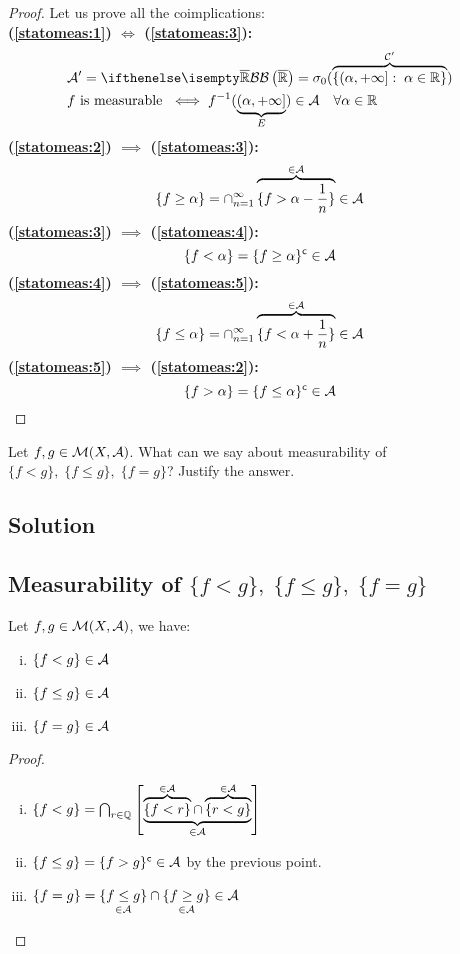 \begin{proof}
    Let us prove all the coimplications:\\
    \textbf{(\ref{statomeas:1}) $\iff$ (\ref{statomeas:3}):}
    \begin{align*}
        & \A'=\B[\Rcomp]=\sigma_0( \overbrace{ \{(\alpha,+\infty]:\; \alpha\in\R\} }^{\mathcal{C}'} ) \\
        & f \text{ is measurable } \iff f^{-1} ( \underbrace{(\alpha,+\infty]}_{E} ) \in \A \quad \forall \alpha \in \R
    \end{align*}
    \textbf{(\ref{statomeas:2}) $\implies$ (\ref{statomeas:3}):}
    \[
        \{ f\geq \alpha \} = \cap_{n=1}^\infty \overbrace{\{ f > \alpha-\frac{1}{n} \}}^{\in\mathcal{A}} \in\mathcal{A} 
    \]
    \textbf{(\ref{statomeas:3}) $\implies$ (\ref{statomeas:4}):}
    \[
        \{ f<\alpha \} = \{ f\geq\alpha \}^{\mathsf{c}} \in\mathcal{A}    
    \]
    \textbf{(\ref{statomeas:4}) $\implies$ (\ref{statomeas:5}):}
    \[
        \{ f \leq \alpha \} = \cap_{n=1}^\infty \overbrace{\{ f < \alpha+\frac{1}{n} \}}^{\in\mathcal{A}} \in\mathcal{A}   
    \]
    \textbf{(\ref{statomeas:5}) $\implies$ (\ref{statomeas:2}):}
    \[
        \{ f>\alpha \} = \{ f\leq\alpha \}^{\mathsf{c}} \in\mathcal{A}    
    \]
\end{proof}


\question

Let $f, g \in \mathcal{M}(X, \mathcal{A})$. What can we say about measurability of $\{f < g\},\; \{f \leq g\},\; \{f = g\}$? Justify the answer.

\subsection*{Solution}

\subsection{Measurability of \texorpdfstring{$\{f < g\},\; \{f \leq g\},\; \{f = g\}$}{ \{f less than g\}, \{f less or equal to g\}, \{f equal to g\}}}
Let $f, g \in \mathcal{M}(X, \mathcal{A})$, we have:
\begin{enumerate}[i)]
    \item $\{f < g\}\in\mathcal{A}$
    \item $\{f \leq g\}\in\mathcal{A}$
    \item $\{f = g\}\in\mathcal{A}$
\end{enumerate}

\begin{proof}
    \hspace*{\fill} %
    \begin{enumerate} [i)]
        \item $\{ f < g \} = \bigcap_{r\in\mathbb{Q}} \left[ \underbrace{\overbrace{\{ f < r \}}^{\in\mathcal{A}} \cap \overbrace{\{ r < g\}}^{\in\mathcal{A}}}_{\in\mathcal{A}} \right]$
        \item $ \{ f\leq g \} = \{ f > g \}^{\mathsf{c}}\in\mathcal{A}$ by the previous point.
        \item $\{f=g\} = \underset{\in\mathcal{A}}{\{ f\leq g \}} \cap \underset{\in\mathcal{A}}{\{ f\geq g \}} \in \mathcal{A}$
    \end{enumerate}
\end{proof}

